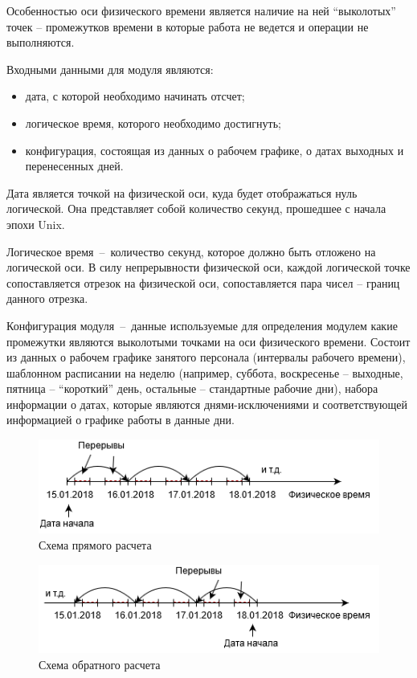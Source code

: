 \indent Особенностью оси физического времени является наличие на ней ``выколотых'' точек -- промежутков времени в которые работа не ведется и операции не выполняются.

\indent Входными данными для модуля являются:

\begin{itemize}
	\item дата, с которой необходимо начинать отсчет;
	\item логическое время, которого необходимо достигнуть;
	\item конфигурация, состоящая из данных о рабочем графике, о датах выходных и перенесенных дней.
\end{itemize}

\indent Дата является точкой на физической оси, куда будет отображаться нуль логической. Она представляет собой количество секунд, прошедшее с начала эпохи Unix.

\indent Логическое время~--~количество секунд, которое должно быть отложено на логической оси. В силу непрерывности физической оси, каждой логической точке сопоставляется отрезок на физической оси, сопоставляется пара чисел -- границ данного отрезка.

\indent Конфигурация модуля~--~данные используемые для определения модулем какие промежутки являются выколотыми точками на оси физического времени.
Состоит из данных о рабочем графике занятого персонала (интервалы рабочего времени), шаблонном расписании на неделю (например, суббота, воскресенье -- выходные, пятница -- ``короткий'' день, остальные -- стандартные рабочие дни), набора информации о датах, которые являются днями-исключениями и соответствующей информацией о графике работы в данные дни.
\begin{figure}[h!]
	\centering
	\includegraphics[width=0.7\linewidth]{pics/scheduleStraightCalc.png}
	\caption{Схема прямого расчета}
	\label{fig:straightCalc}
\end{figure}
\begin{figure}[h!]
	\centering
	\includegraphics[width=0.7\linewidth]{pics/scheduleReverceCalc.png}
	\caption{Схема обратного расчета}
	\label{fig:reverceCalc}
\end{figure}

